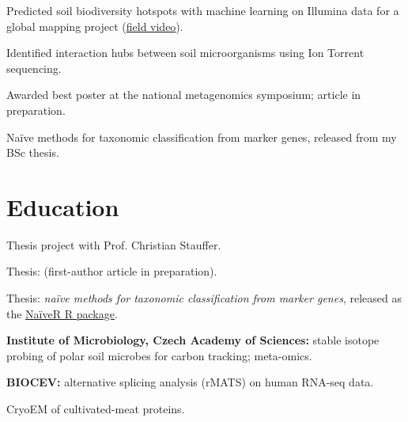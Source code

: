 \documentclass[]{deedy-resume-openfont}
\newcommand{\entrysep}{\vspace{6pt}}
\newcommand{\entrynote}[1]{{\footnotesize\color{headings}#1}\par}
\begin{document}
\begin{tightemize}
\item Predicted soil biodiversity hotspots with machine learning on Illumina data for a global mapping project (\href{\MySpunVideoURL{}}{field video}).
\end{tightemize}
\entrysep

\begin{tightemize}
\item Identified interaction hubs between soil microorganisms using Ion Torrent sequencing.
\item Awarded best poster at the national metagenomics symposium; article in preparation.
\end{tightemize}
\entrysep

\begin{tightemize}
\item Naïve methods for taxonomic classification from marker genes, released from my BSc thesis.
\end{tightemize}


\section{Education}

\entrynote{Thesis project with Prof. Christian Stauffer.}
\entrysep

\entrynote{Thesis: \ThesisMsc{} (first-author article in preparation).}
\entrysep

\entrynote{Thesis: \textit{naïve methods for taxonomic classification from marker genes}, released as the \href{\MyNaiveRURL{}}{NaïveR R package}.}
\entrysep

\begin{tightemize}
\item \textbf{Institute of Microbiology, Czech Academy of Sciences:} stable isotope probing of polar soil microbes for carbon tracking; meta-omics.
\item \textbf{BIOCEV:} alternative splicing analysis (rMATS) on human RNA-seq data.
\item CryoEM of cultivated-meat proteins.
\end{tightemize}
\entrysep
\end{document}
